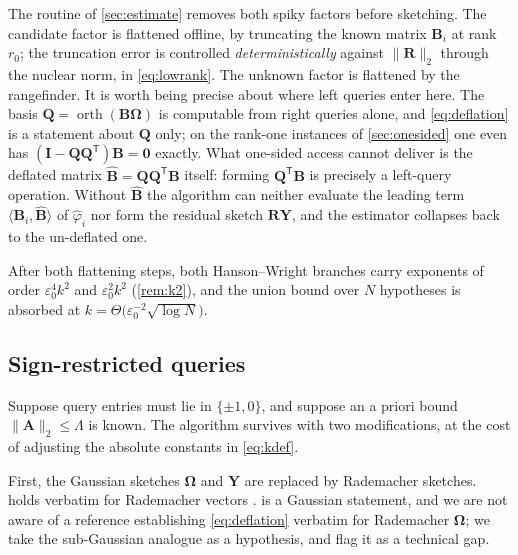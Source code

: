 \documentclass{article}
\renewcommand{\vec}[1]{\mathbf{#1}}          %
\newcommand{\T}{\mathsf{T}}                  %
\newcommand{\eps}{\varepsilon}
\newcommand{\inner}[2]{\langle #1, #2 \rangle}
\DeclareMathOperator{\orth}{orth}
\theoremstyle{remark}
\begin{document}
The routine of \cref{sec:estimate} removes both spiky factors before sketching.
The candidate factor is flattened offline, by truncating the known matrix $\vec{B}_i$ at rank $r_0$; the truncation error is controlled \emph{deterministically} against $\|\vec{R}\|_2$ through the nuclear norm, in \cref{eq:lowrank}.
The unknown factor is flattened by the rangefinder.
It is worth being precise about where left queries enter here.
The basis $\vec{Q} = \orth(\vec{B}\vec{\Omega})$ is computable from right queries alone, and \cref{eq:deflation} is a statement about $\vec{Q}$ only; on the rank-one instances of \cref{sec:onesided} one even has $(\vec{I} - \vec{Q}\vec{Q}^\T)\vec{B} = \vec 0$ exactly.
What one-sided access cannot deliver is the deflated matrix $\widehat{\vec{B}} = \vec{Q}\vec{Q}^\T\vec{B}$ itself: forming $\vec{Q}^\T\vec{B}$ is precisely a left-query operation.
Without $\widehat{\vec{B}}$ the algorithm can neither evaluate the leading term $\inner{\vec{B}_i}{\widehat{\vec{B}}}$ of $\hat\varphi_i$ nor form the residual sketch $\vec{R}\vec{Y}$, and the estimator collapses back to the un-deflated one.

After both flattening steps, both Hanson--Wright branches carry exponents of order $\eps_0^4 k^2$ and $\eps_0^2 k^2$ (\cref{rem:k2}), and the union bound over $N$ hypotheses is absorbed at $k = \Theta\bigl(\eps_0^{-2}\sqrt{\log N}\bigr)$.

\subsection{Sign-restricted queries}\label{sec:signs}

Suppose query entries must lie in $\{\pm 1, 0\}$, and suppose an a priori bound $\|\vec{A}\|_2 \le \Lambda$ is known.
The algorithm survives with two modifications, at the cost of adjusting the absolute constants in \cref{eq:kdef}.

First, the Gaussian sketches $\vec{\Omega}$ and $\vec{Y}$ are replaced by Rademacher sketches.
 holds verbatim for Rademacher vectors \cite{rudelson2013hanson}.
 is a Gaussian statement, and we are not aware of a reference establishing \cref{eq:deflation} verbatim for Rademacher $\vec{\Omega}$; we take the sub-Gaussian analogue as a hypothesis, and flag it as a technical gap.
\end{document}
